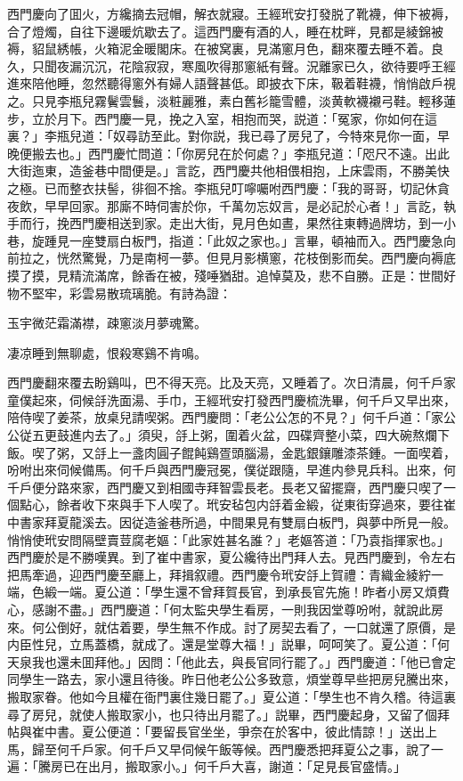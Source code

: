 西門慶向了囬火，方纔摘去冠帽，解衣就寢。王經玳安打發脱了靴襪，伸下被褥，合了燈燭，自往下邊暖炕歇去了。這西門慶有酒的人，睡在枕畔，見都是綾錦被褥，貂鼠綉帳，火箱泥金暖閣床。在被窝裏，見滿窻月色，翻來覆去睡不着。良久，只聞夜漏沉沉，花陰寂寂，寒風吹得那窻紙有聲。況離家已久，欲待要呼王經進來陪他睡，忽然聽得窻外有婦人語聲甚低。即披衣下床，靸着鞋襪，悄悄啟戶視之。只見李瓶兒霧鬢雲鬟，淡粧麗雅，素白舊衫籠雪體，淡黄軟襪襯弓鞋。輕移蓮步，立於月下。西門慶一見，挽之入室，相抱而哭，説道：「冤家，你如何在這裏？」李瓶兒道：「奴尋訪至此。對你説，我已尋了房兒了，今特來見你一面，早晚便搬去也。」西門慶忙問道：「你房兒在於何處？」李瓶兒道：「咫尺不遠。出此大街迤東，造釜巷中間便是。」言訖，西門慶共他相偎相抱，上床雲雨，不勝美快之極。已而整衣扶髻，徘徊不捨。李瓶兒叮嚀囑咐西門慶：「我的哥哥，切記休貪夜飲，早早回家。那廝不時伺害於你，千萬勿忘奴言，是必記於心者！」言訖，執手而行，挽西門慶相送到家。走出大街，見月色如晝，果然往東轉過牌坊，到一小巷，旋踵見一座雙扇白板門，指道：「此奴之家也。」言畢，頓袖而入。西門慶急向前拉之，恍然驚覺，乃是南柯一夢。但見月影横窻，花枝倒影而矣。西門慶向褥底摸了摸，見精流滿席，餘香在被，殘唾猶甜。追悼莫及，悲不自勝。正是：世間好物不堅牢，彩雲易散琉璃脆。有詩為證：

\begin{myquote}
玉宇微茫霜滿襟，疎窻淡月夢魂驚。

凄凉睡到無聊處，恨殺寒鷄不肯鳴。
\end{myquote}

西門慶翻來覆去盼鷄叫，巴不得天亮。比及天亮，又睡着了。次日清晨，何千戶家童僕起來，伺候㧱洗面湯、手巾，王經玳安打發西門慶梳洗畢，何千戶又早出來，陪侍喫了姜茶，放桌兒請喫粥。西門慶問：「老公公怎的不見？」何千戶道：「家公公従五更鼓進内去了。」須臾，㧱上粥，圍着火盆，四碟齊整小菜，四大碗熬爛下飯。喫了粥，又㧱上一盞肉圓子餛飩鷄疍頭腦湯，金匙銀鑲雕漆茶鍾。一面喫着，吩咐出來伺候備馬。何千戶與西門慶冠冕，僕従跟隨，早進内參見兵科。出來，何千戶便分路來家，西門慶又到相國寺拜智雲長老。長老又留擺齋，西門慶只喫了一個點心，餘者收下來與手下人喫了。玳安毡包内㧱着金緞，従東街穿過來，要往崔中書家拜夏龍溪去。因従造釜巷所過，中間果見有雙扇白板門，與夢中所見一般。悄悄使玳安問隔壁賣荳腐老嫗：「此家姓甚名誰？」老嫗答道：「乃袁指揮家也。」西門慶於是不勝嘆異。到了崔中書家，夏公纔待出門拜人去。見西門慶到，令左右把馬牽過，迎西門慶至廳上，拜揖叙禮。西門慶令玳安㧱上賀禮：青織金綾紵一端，色緞一端。夏公道：「學生還不曾拜賀長官，到承長官先施！昨者小房又煩費心，感謝不盡。」西門慶道：「何太監央學生看房，一則我因堂尊吩咐，就說此房來。何公倒好，就估着要，學生無不作成。討了房契去看了，一口就還了原價，是内臣性兒，立馬蓋橋，就成了。還是堂尊大福！」説畢，呵呵笑了。夏公道：「何天泉我也還未囬拜他。」因問：「他此去，與長官同行罷了。」西門慶道：「他已會定同學生一路去，家小還且待後。昨日他老公公多致意，煩堂尊早些把房兒騰出來，搬取家眷。他如今且權在衙門裏住幾日罷了。」夏公道：「學生也不肯久稽。待這裏尋了房兒，就使人搬取家小，也只待出月罷了。」説畢，西門慶起身，又留了個拜帖與崔中書。夏公便道：「要留長官坐坐，爭奈在於客中，彼此情諒！」送出上馬，歸至何千戶家。何千戶又早伺候午飯等候。西門慶悉把拜夏公之事，說了一遍：「騰房已在出月，搬取家小。」何千戶大喜，謝道：「足見長官盛情。」

